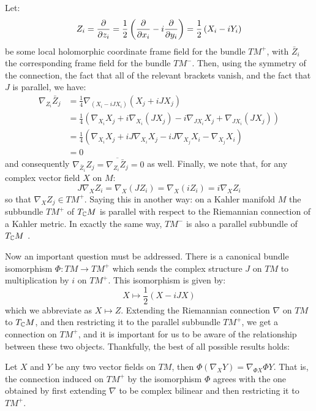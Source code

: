 Let:
%
$$ Z_i = \frac{ \partial }{ \partial z_i } = \frac{1}{2} \left( \frac{ \partial }{ \partial x_i } - i \frac{ \partial }{ \partial y_i } \right) = \frac{1}{2}\left( X_i - i Y_i \right) $$
%
be some local holomorphic coordinate frame field for the bundle $TM^{+}$, with $\bar{Z}_i$ the corresponding frame field for the bundle $TM^{-}$.
Then, using the symmetry of the connection, the fact that all of the relevant brackets vanish, and the fact that $J$ is parallel, we have:
%
\begin{align*}
\nabla_{Z_i} \bar{Z}_j &= \frac{1}{4} \nabla_{(X_i - i J X_i)} (X_j + i J X_j ) \\
&= \frac{1}{4} ( \nabla_{X_i} X_j + i \nabla_{X_i} (J X_j) - i \nabla_{J X_i} X_j + \nabla_{J X_i} ( J X_j ) )\\
&= \frac{1}{4} ( \nabla_{X_i} X_j + i J \nabla_{X_i} X_j - i J \nabla_{X_j} X_i - \nabla_{X_j} X_i ) \\
&= 0
\end{align*}
%
and consequently $\nabla_{\bar{Z}_i} Z_j = \overline{ \nabla_{Z_i} \bar{Z}_j } = 0$ as well.  Finally, we note that, for any complex vector field $X$ on $M$:
%
$$ J \nabla_{X} Z_i = \nabla_{X}(J Z_i) = \nabla_{X}( iZ_i ) = i \nabla_{X} Z_i $$
%
so that $\nabla_{X} Z_j \in TM^{+}$.  Saying this in another way: on a Kahler manifold $M$ the subbundle $TM^{+}$ of $T_{\mathbb{C}} M$ is parallel with respect to the Riemannian connection of a Kahler metric.  In exactly the same way, $TM^{-}$ is also a parallel subbundle of $T_{\mathbb{C}}M$ .

Now an important question must be addressed.  There is a canonical bundle isomorphism $\Phi: TM \rightarrow TM^{+}$ which sends the complex structure $J$ on $TM$ to multiplication by $i$ on $TM^{+}$.  This isomorphism is given by:
%
$$ X \mapsto \frac{1}{2}( X - i JX )$$
%
which we abbreviate as $X \mapsto Z$. Extending the Riemannian connection $\nabla$ on $TM$ to $T_{\mathbb{C}}M$, and then restricting it to the parallel subbundle $TM^{+}$, we get a connection on $TM^{+}$, and it is important for us to be aware of the relationship between these two objects.  Thankfully, the best of all possible results holds:

\begin{prop} Let $X$ and $Y$ be any two vector fields on $TM$, then $\Phi( \nabla_X Y ) = \nabla_{ \Phi X } \Phi Y$.  That is, the connection induced on $TM^{+}$ by the isomorphism $\Phi$ agrees with the one obtained by first extending $\nabla$ to be complex bilinear and then restricting it to $TM^{+}$.
\end{prop}


